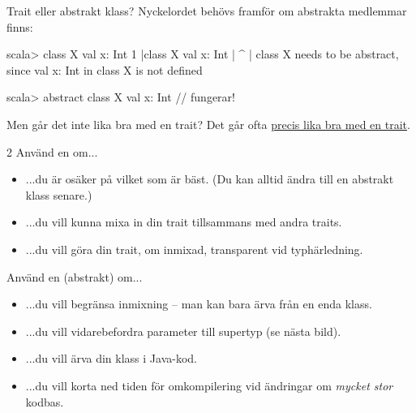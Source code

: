 \begin{Slide}{Trait eller abstrakt klass?}\SlideFontSmall
Nyckelordet  behövs framför  om abstrakta medlemmar finns:
\begin{REPLsmall}
scala> class X { val x: Int }
1 |class X { val x: Int }
  |      ^
  |      class X needs to be abstract, since val x: Int in class X is not defined 

scala> abstract class X { val x: Int }  // fungerar!
\end{REPLsmall}  
Men går det inte lika bra med en trait? \pause Det går ofta \href{https://youtu.be/aFmIS5qeetA?t=221}{precis lika bra med en trait}.%
\label{slideW07:traitorclass}%
\begin{multicols}{2}
\noindent Använd en  om...
\begin{itemize}\SlideFontTiny
\item ...du är osäker på vilket som är bäst. (Du kan alltid ändra till en abstrakt klass senare.)
\item ...du vill kunna mixa in din trait tillsammans med andra traits.
\item ...du vill göra din trait, om inmixad, transparent vid typhärledning.

\end{itemize}

\columnbreak

\noindent Använd en (abstrakt)  om...
\begin{itemize}\SlideFontTiny
\item ...du vill begränsa inmixning -- man kan bara ärva från en enda klass. 
\item ...du vill vidarebefordra parameter till supertyp (se nästa bild).
\item ...du vill ärva din klass i Java-kod.
\item ...du vill korta ned tiden för omkompilering vid ändringar om \emph{mycket stor} kodbas.
\end{itemize}
\end{multicols}
\end{Slide}

